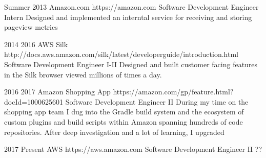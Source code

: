 \job
{Summer 2013} {}
{Amazon.com} {https://amazon.com}
{Software Development Engineer Intern}
{Designed and implemented an interntal service for receiving and storing pageview metrics}

\job
{2014} {2016}
{AWS Silk} {http://docs.aws.amazon.com/silk/latest/developerguide/introduction.html}
{Software Development Engineer I-II}
{Designed and built customer facing features in the Silk browser viewed millions of times a day. }

\job
{2016} {2017}
{Amazon Shopping App} {https://amazon.com/gp/feature.html?docId=1000625601}
{Software Development Engineer II}
{During my time on the shopping app team I dug into the Gradle build system and the ecosystem of custom plugins and build scripts within Amazon spanning hundreds of code repositories. After deep investigation and a lot of learning, I upgraded }

\job
{2017} {Present}
{AWS} {https://aws.amazon.com}
{Software Development Engineer II}
{??}